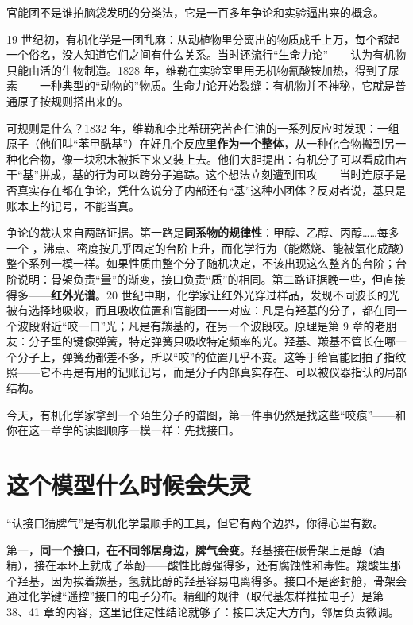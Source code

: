 \begin{zhengju}
官能团不是谁拍脑袋发明的分类法，它是一百多年争论和实验逼出来的概念。

19 世纪初，有机化学是一团乱麻：从动植物里分离出的物质成千上万，每个都起一个俗名，没人知道它们之间有什么关系。当时还流行“生命力论”——认为有机物只能由活的生物制造。1828 年，维勒在实验室里用无机物氰酸铵加热，得到了尿素——一种典型的“动物的”物质。生命力论开始裂缝：有机物并不神秘，它就是普通原子按规则搭出来的。

可规则是什么？1832 年，维勒和李比希研究苦杏仁油的一系列反应时发现：一组原子（他们叫“苯甲酰基”）在好几个反应里\textbf{作为一个整体}，从一种化合物搬到另一种化合物，像一块积木被拆下来又装上去。他们大胆提出：有机分子可以看成由若干“基”拼成，基的行为可以跨分子追踪。这个想法立刻遭到围攻——当时连原子是否真实存在都在争论，凭什么说分子内部还有“基”这种小团体？反对者说，基只是账本上的记号，不能当真。

争论的裁决来自两路证据。第一路是\textbf{同系物的规律性}：甲醇、乙醇、丙醇……每多一个 ，沸点、密度按几乎固定的台阶上升，而化学行为（能燃烧、能被氧化成酸）整个系列一模一样。如果性质由整个分子随机决定，不该出现这么整齐的台阶；台阶说明：骨架负责“量”的渐变，接口负责“质”的相同。第二路证据晚一些，但直接得多——\textbf{红外光谱}。20 世纪中期，化学家让红外光穿过样品，发现不同波长的光被有选择地吸收，而且吸收位置和官能团一一对应：凡是有羟基的分子，都在同一个波段附近“咬一口”光；凡是有羰基的，在另一个波段咬。原理是第 9 章的老朋友：分子里的键像弹簧，特定弹簧只吸收特定频率的光。羟基、羰基不管长在哪一个分子上，弹簧劲都差不多，所以“咬”的位置几乎不变。这等于给官能团拍了指纹照——它不再是有用的记账记号，而是分子内部真实存在、可以被仪器指认的局部结构。

今天，有机化学家拿到一个陌生分子的谱图，第一件事仍然是找这些“咬痕”——和你在这一章学的读图顺序一模一样：先找接口。
\end{zhengju}

\section{这个模型什么时候会失灵}

“认接口猜脾气”是有机化学最顺手的工具，但它有两个边界，你得心里有数。

第一，\textbf{同一个接口，在不同邻居身边，脾气会变}。羟基接在碳骨架上是醇（酒精），接在苯环上就成了苯酚——酸性比醇强得多，还有腐蚀性和毒性。羧酸里那个羟基，因为挨着羰基，氢就比醇的羟基容易电离得多。接口不是密封舱，骨架会通过化学键“遥控”接口的电子分布。精细的规律（取代基怎样推拉电子）是第 38、41 章的内容，这里记住定性结论就够了：接口决定大方向，邻居负责微调。

